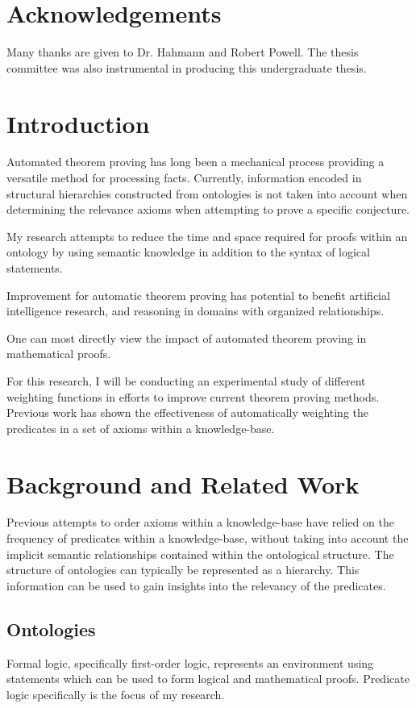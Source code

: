 \documentclass{article}
\begin{document}
\begin{spacing}{2}
\section*{Acknowledgements}
Many thanks are given to Dr. Hahmann and Robert Powell. The thesis committee was also instrumental in producing this undergraduate thesis.
\newpage
\section{Introduction}
Automated theorem proving has long been a mechanical process providing a versatile method for processing facts. Currently, information encoded in structural hierarchies constructed from ontologies is not taken into account when determining the relevance axioms when attempting to prove a specific conjecture. 

My research attempts to reduce the time and space required for proofs within an ontology by using semantic knowledge in addition to the syntax of logical statements. 

Improvement for automatic theorem proving has potential to benefit artificial intelligence research, and reasoning in domains with organized relationships. 

One can most directly view the impact of automated theorem proving in mathematical proofs. 

For this research, I will be conducting an experimental study of different weighting functions in efforts to improve current theorem proving methods. Previous work has shown the effectiveness of automatically weighting the predicates in a set of axioms within a knowledge-base.

\newpage
\section{Background and Related Work}

Previous attempts to order axioms within a knowledge-base have relied on the frequency of predicates within a knowledge-base, without taking into account the implicit semantic relationships contained within the ontological structure. The structure of ontologies can typically be represented as a hierarchy. This information can be used to gain insights into the relevancy of the predicates. 



\subsection{Ontologies}
Formal logic, specifically first-order logic, represents an environment using statements which can be used to form logical and mathematical proofs. Predicate logic specifically is the focus of my research. 


\end{spacing}
\end{document}
